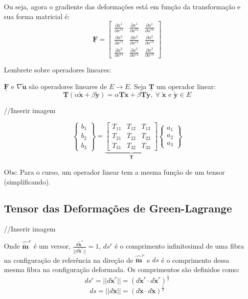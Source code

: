	Ou seja, agora o gradiente das deformações está em função da transformação e sua forma matricial é:
	\[
	\underline{\mathbf{F}}=
	\begin{bmatrix}
		\frac{\partial x^1}{\partial x^{r1}} & \frac{\partial x^1}{\partial x^{r2}} & \frac{\partial x^1}{\partial x^{r3}} \\
		\frac{\partial x^2}{\partial x^{r1}} & \frac{\partial x^2}{\partial x^{r2}} & \frac{\partial x^2}{\partial x^{r3}} \\
		\frac{\partial x^3}{\partial x^{r1}} & \frac{\partial x^3}{\partial x^{r2}} & \frac{\partial x^3}{\partial x^{r3}}
	\end{bmatrix}	
	\]
	
	Lembrete sobre operadores lineares:
	
	$\underline{\mathbf{F}}$ e $\nabla\utilde{\mathbf{u}}$  são operadores lineares de $E\rightarrow E$. Seja $\mathbf{\underline{T}}$ um operador linear:
	\[\mathbf{\underline{T}}(\alpha\utilde{\mathbf{x}}+\beta\utilde{\mathbf{y}})=\alpha\mathbf{\underline{T}}\utilde{\mathbf{x}}+\beta\mathbf{\underline{T}}\utilde{\mathbf{y}},\;\forall\;\mathbf{\utilde{\mathbf{x}}}\text{ e }\mathbf{\utilde{\mathbf{y}}}\in\text{$E$}\]
	
	//Inserir imagem
	
	\[
		\begin{Bmatrix}
		b_1 \\ b_2 \\ b_3
		\end{Bmatrix}
		=
		\underbrace{
		\begin{bmatrix}
		T_{11} & T_{12} & T_{13} \\
		T_{21} & T_{22} & T_{23} \\
		T_{31} & T_{32} & T_{33}
		\end{bmatrix}
		}_{\displaystyle\mathbf{\underline{T}}}
		\begin{Bmatrix}
		a_1 \\ a_2 \\ a_3
		\end{Bmatrix}
	\]
	
	Obs: Para o curso, um operador linear tem a mesma função de um tensor (simplificando).
	
	\subsection{Tensor das Deformações de Green-Lagrange}
	
	//Inserir imagem
	
	Onde $\hat{\utilde{\mathbf{m}}}^r$ é um versor, $\displaystyle\frac{d\utilde{\mathbf{x}}^r}{||d\utilde{\mathbf{x}}^r||}=1$, $ds^r$ é o comprimento infinitesimal de uma fibra na configuração de referência na direção de $\hat{\utilde{\mathbf{m}}}^r$ e $ds$ é o comprimento dessa mesma fibra na configuração deformada. Os comprimentos são definidos como:
	\[ds^r=||d\utilde{\mathbf{x}}^r||=(d\utilde{\mathbf{x}}^r\cdot d\utilde{\mathbf{x}}^r)^{\frac{1}{2}}\]
	\[ds=||d\utilde{\mathbf{x}}||=(d\utilde{\mathbf{x}}\cdot d\utilde{\mathbf{x}})^{\frac{1}{2}}\]
	
